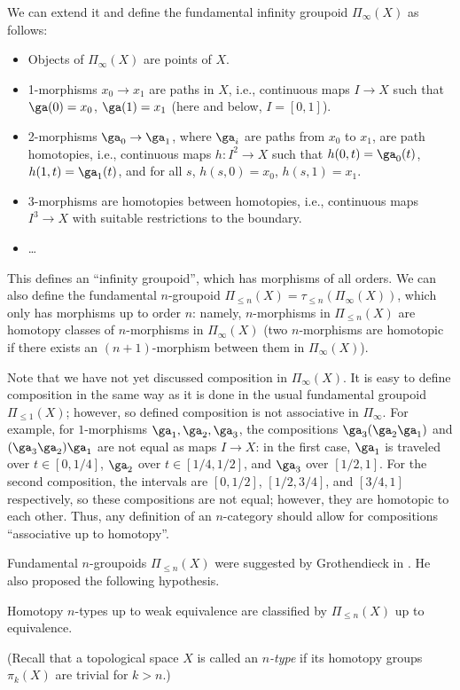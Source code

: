 We can extend it and define the fundamental infinity groupoid $\Pi_{\infty}(X)$
as follows:
\begin{itemize}
  \item Objects of $\Pi_{\infty}(X)$ are points of $X$.
  \item 1-morphisms $x_0\to x_1$ are paths in $X$, i.e., continuous maps
    $I\to X$ such that $\ga(0)=x_0$, $\ga(1)=x_1$ (here and below, $I=[0,1]$).
  \item 2-morphisms $\ga_0\to \ga_1$, where $\ga_i$ are paths from $x_0$ to
  $x_1$, are path homotopies, i.e., continuous maps $h\colon I^2\to X$ such that
  $h(0,t)=\ga_0(t)$, $h(1, t)=\ga_1(t)$, and for all $s$, $h(s,0)=x_0$,
  $h(s,1)=x_1$.
  \item 3-morphisms are homotopies between homotopies, i.e., continuous maps
  $I^3\to X$ with suitable restrictions to the boundary.
  \item \dots
\end{itemize}
This defines an ``infinity groupoid'', which has morphisms of all orders. We can
also define the fundamental $n$-groupoid $\Pi_{\leq n}(X)=\tau_{\leq
n}(\Pi_\infty(X))$, which only has morphisms up to order $n$: namely,
$n$-morphisms in $\Pi_{\leq n}(X)$ are homotopy classes of
$n$-morphisms in $\Pi_{\infty}(X)$ (two $n$-morphisms are homotopic if there
exists an $(n+1)$-morphism between them in $\Pi_\infty(X)$).

Note that we have not yet discussed composition in $\Pi_\infty(X)$. It is easy
to define composition in the same way as it is done in the usual fundamental
groupoid $\Pi_{\le 1}(X)$; however, so defined composition is not associative in
$\Pi_\infty$. For example, for $1$-morphisms $\ga_1, \ga_2, \ga_3$, the
compositions $\ga_3 (\ga_2 \ga_1)$ and $(\ga_3 \ga_2)\ga_1$ are not equal as
maps $I\to X$: in the first case, $\ga_1$ is traveled over $t\in [0, 1/4]$,
$\ga_2$ over $t\in [1/4, 1/2]$, and $\ga_3$ over $[1/2,1]$. For the second
composition, the intervals are $[0, 1/2]$, $[1/2, 3/4]$, and $[3/4,1]$
respectively, so these compositions are not equal; however, they are homotopic
to each other. Thus, any definition of an $n$-category should allow for
compositions ``associative up to homotopy''.


Fundamental $n$-groupoids $\Pi_{\leq n}(X)$ were suggested by Grothendieck in
. He also proposed the following hypothesis.
\begin{conjecture}
  Homotopy $n$-types up to weak equivalence
  are classified by $\Pi_{\leq n}(X)$ up to equivalence.
\end{conjecture}
(Recall that a topological space $X$ is called an \emph{$n$-type} if its
homotopy groups $\pi_k(X)$ are trivial for $k>n$.)

